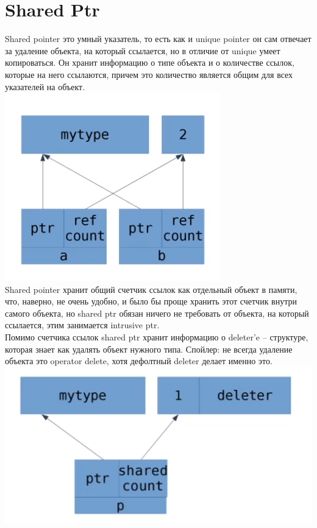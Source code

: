 \documentclass[12pt, a4paper]{article}
\begin{document}
	\section{Shared Ptr}
	Shared pointer это умный указатель, то есть как и unique pointer он сам отвечает за удаление объекта, на который ссылается, но в отличие от unique умеет копироваться. Он хранит информацию о типе объекта и о количестве ссылок, которые на него ссылаются, причем это количество является общим для всех указателей на объект.\\
	\includegraphics[scale=0.8]{shared.png}\\
	Shared pointer хранит общий счетчик ссылок как отдельный объект в памяти, что, наверно, не очень удобно, и было бы проще хранить этот счетчик внутри самого объекта, но shared ptr обязан ничего не требовать от объекта, на который ссылается, этим занимается intrusive ptr.\\
	Помимо счетчика ссылок shared ptr хранит информацию о deleter'e -- структуре, которая знает как удалять объект нужного типа. Спойлер: не всегда удаление объекта это operator delete, хотя дефолтный deleter делает именно это.\\
	\includegraphics[scale=0.8]{deleter.png}\\
\end{document}
